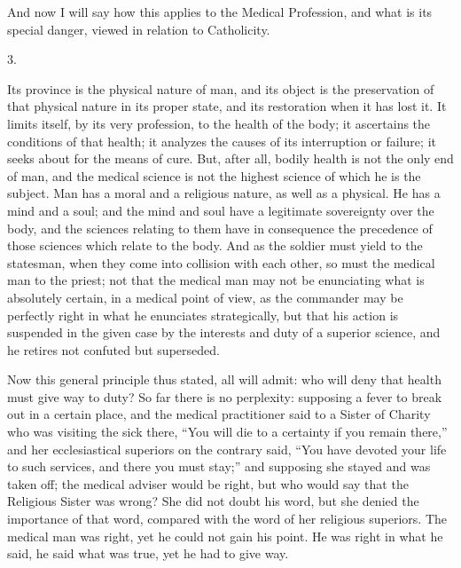 And now I will say how this applies to the Medical Profession, and
what is its special danger, viewed in relation to Catholicity.

3.

Its province is the physical nature of man, and its object is the
preservation of that physical nature in its proper state, and its
restoration when it has lost it. It limits itself, by its very
profession, to the health of the body; it ascertains the conditions of
that health; it analyzes the causes of its interruption or failure; it
seeks about for the means of cure. But, after all, bodily health is
not the only end of man, and the medical science is not the highest
science of which he is the subject. Man has a moral and a religious
nature, as well as a physical. He has a mind and a soul; and the
mind and soul have a legitimate sovereignty over the body, and the
sciences relating to them have in consequence the precedence of those
sciences which relate to the body. And as the soldier must yield to
the statesman, when they come into collision with each other, so must
the medical man to the priest; not that the medical man may not be
enunciating what is absolutely certain, in a medical point of view, as
the commander may be perfectly right in what he enunciates
strategically, but that his action is suspended in the given case by
the interests and duty of a superior science, and he retires not
confuted but superseded.

Now this general principle thus stated, all will admit: who will
deny that health must give way to duty? So far there is no perplexity:
supposing a fever to break out in a certain place, and the medical
practitioner said to a Sister of Charity who was visiting the sick
there, ``You will die to a certainty if you remain there,''
and her ecclesiastical superiors on the contrary said, ``You have
devoted your life to such services, and there you must stay;'' and
supposing she stayed and was taken off; the medical adviser would be
right, but who would say that the Religious Sister was wrong? She did
not doubt his word, but she denied the importance of that word,
compared with the word of her religious superiors. The medical man was
right, yet he could not gain his point. He was right in what he said,
he said what was true, yet he had to give way.

